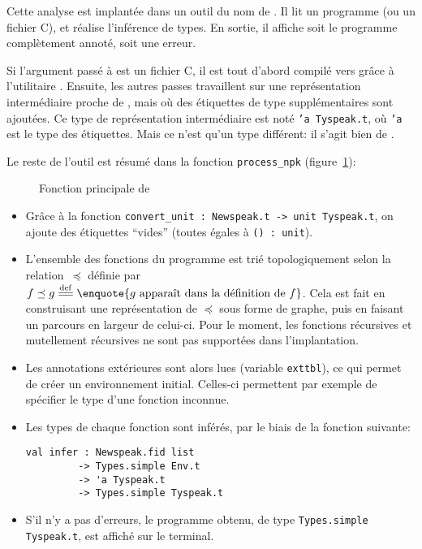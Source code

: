 Cette analyse est implantée dans un outil du nom de \ptrtype{}. Il lit un
programme \newspeak (ou un fichier C), et réalise l'inférence de types. En
sortie, il affiche soit le programme complètement annoté, soit une erreur.

Si l'argument passé à \ptrtype{} est un fichier C, il est tout d'abord compilé
vers \newspeak grâce à l'utilitaire \ctonewspeak. Ensuite, les autres passes
travaillent sur une représentation intermédiaire proche de \newspeak, mais où
des étiquettes de type supplémentaires sont ajoutées. Ce type de représentation
intermédiaire est noté \texttt{'a Tyspeak.t}, où \texttt{'a} est le type des
étiquettes. Mais ce n'est qu'un type différent: il s'agit bien de \newspeak.

Le reste de l'outil est résumé dans la fonction
\texttt{process\_npk} (figure~\ref{fig:implem-process}):

\begin{figure}
\caption{Fonction principale de \ptrtype{}}
\label{fig:implem-process}
\end{figure}

\begin{itemize}

\item Grâce à la fonction \verb!convert_unit : Newspeak.t -> unit Tyspeak.t!, on
ajoute des étiquettes \enquote{vides} (toutes égales à \verb!() : unit!).

\item L'ensemble des fonctions du programme est trié topologiquement selon la
    relation~$\preceq$ définie par $f \preceq g \eqdef \enquote{g \textrm{
    apparaît dans la définition de } f}$. Cela est fait en construisant une
    représentation de $\preceq$ sous forme de graphe, puis en faisant un
    parcours en largeur de celui-ci. Pour le moment, les fonctions récursives et
    mutellement récursives ne sont pas supportées dans l'implantation.

\item Les annotations extérieures sont alors lues (variable \texttt{exttbl}), ce
  qui permet de créer un environnement initial. Celles-ci permettent par exemple
  de spécifier le type d'une fonction inconnue.

\item Les types de chaque fonction sont inférés, par le biais de la fonction
  suivante:

\begin{Verbatim}
val infer : Newspeak.fid list
         -> Types.simple Env.t
         -> 'a Tyspeak.t
         -> Types.simple Tyspeak.t
\end{Verbatim}

\item S'il n'y a pas d'erreurs, le programme obtenu, de type
\texttt{Types.simple Tyspeak.t}, est affiché sur le terminal.

\end{itemize}


